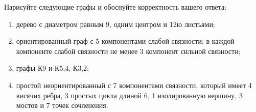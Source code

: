 \question 
Нарисуйте следующие графы и обоснуйте корректность вашего ответа:
\begin{enumerate}
\item  дерево с диаметром равным 9, одним центром  и  12ю листьями;
\item  ориентированный граф с 5 компонентами слабой связности: в  каждой компоненте слабой связности не менее 3 компонент сильной связности;
\item  графы К9 и К5,4, К3,2;
\item  простой неориентированный с 7 компонентами связности, который имеет 4 висячих ребра, 3 простых цикла длиной 6, 1 изолированную вершину, 3 мостов и 7 точек сочленения.
\end{enumerate}
